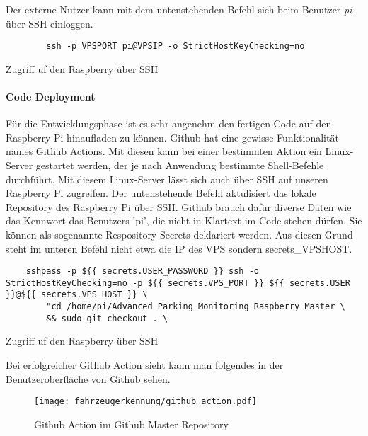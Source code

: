 Der externe Nutzer kann mit dem untenstehenden Befehl sich beim Benutzer \textit{pi} über SSH einloggen.

\begin{listing}[H]
    \begin{verbatim}
        ssh -p VPSPORT pi@VPSIP -o StrictHostKeyChecking=no
    \end{verbatim}
    \caption{Zugriff uf den Raspberry über SSH}
\end{listing}




\paragraph{Code Deployment} \mbox{} 

Für die Entwicklungsphase ist es sehr angenehm den fertigen Code auf den Raspberry Pi hinaufladen zu können. Github hat eine gewisse Funktionalität names Github Actions. Mit diesen kann bei einer bestimmten Aktion ein Linux-Server gestartet werden, der je nach
Anwendung bestimmte Shell-Befehle durchführt. Mit diesem Linux-Server lässt sich auch über SSH auf unseren Raspberry Pi zugreifen. Der untenstehende Befehl aktulisiert das lokale Repository des Raspberry Pi über SSH. Github brauch dafür diverse Daten wie das Kennwort
das Benutzers 'pi', die nicht in Klartext im Code stehen dürfen. Sie können als sogenannte Respository-Secrets deklariert werden. Aus diesen Grund steht im unteren Befehl nicht etwa die IP des VPS sondern secrets\_VPSHOST.  

\begin{listing}[H]
    \begin{verbatim}
    sshpass -p ${{ secrets.USER_PASSWORD }} ssh -o StrictHostKeyChecking=no -p ${{ secrets.VPS_PORT }} ${{ secrets.USER }}@${{ secrets.VPS_HOST }} \
        "cd /home/pi/Advanced_Parking_Monitoring_Raspberry_Master \
        && sudo git checkout . \
    \end{verbatim}
    \caption{Zugriff uf den Raspberry über SSH}
\end{listing}

Bei erfolgreicher Github Action sieht kann man folgendes in der Benutzeroberfläche von Github sehen.

\begin{figure}[H]
    \centering
    \texttt{[image: fahrzeugerkennung/github action.pdf]}
    \caption{Github Action im Github Master Repository}
\end{figure}


\pagebreak


